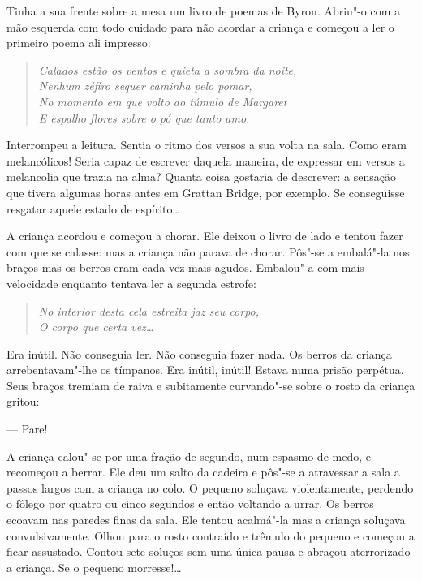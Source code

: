 Tinha a sua frente sobre a mesa um livro de poemas de Byron.  Abriu"-o com a mão
esquerda com todo cuidado para não acordar a criança e começou a ler o primeiro
poema ali impresso:

\begin{verse}\itshape
Calados estão os ventos e quieta a sombra da \qb{}noite,\\
Nenhum zéfiro sequer caminha pelo pomar,\\
No momento em que volto ao túmulo de Margaret\\
E espalho flores sobre o pó que tanto amo.
\end{verse}

Interrompeu a leitura.  Sentia o ritmo dos versos a sua volta na sala.  Como
eram melancólicos!  Seria capaz de escrever daquela maneira, de expressar em
versos a melancolia que trazia na alma?  Quanta coisa gostaria de descrever: a
sensação que tivera algumas horas antes em Grattan Bridge, por exemplo.  Se
conseguisse resgatar aquele estado de espírito\ldots{}

A criança acordou e começou a chorar.  Ele deixou o livro de lado e tentou
fazer com que se calasse: mas a criança não parava de chorar.  Pôs"-se a
embalá"-la nos braços mas os berros eram cada vez mais agudos.  Embalou"-a com
mais velocidade enquanto tentava ler a segunda estrofe:

\begin{verse}\itshape
No interior desta cela estreita jaz seu corpo,\\
O corpo que certa vez\ldots{}
\end{verse}

Era inútil.  Não conseguia ler.  Não conseguia fazer nada.  Os berros da
criança arrebentavam"-lhe os tímpanos.  Era inútil, inútil!  Estava numa prisão
perpétua.  Seus braços tremiam de raiva e subitamente curvando"-se sobre o rosto
da criança gritou:

--- Pare!

A criança calou"-se por uma fração de segundo, num espasmo de medo, e recomeçou
a berrar.  Ele deu um salto da cadeira e pôs"-se a atravessar a sala a passos
largos com a criança no colo.  O pequeno soluçava violentamente, perdendo o
fôlego por quatro ou cinco segundos e então voltando a urrar.  Os berros
ecoavam nas paredes finas da sala.  Ele tentou acalmá"-la mas a criança soluçava
convulsivamente.  Olhou para o rosto contraído e trêmulo do pequeno e começou a
ficar assustado.  Contou sete soluços sem uma única pausa e abraçou
aterrorizado a criança.  Se o pequeno morresse!\ldots{}

